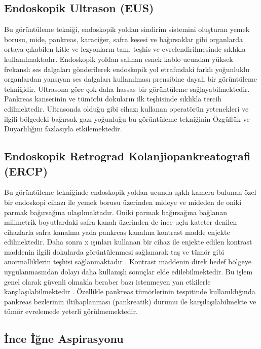 \subsection{Endoskopik Ultrason (EUS)}

Bu görüntüleme tekniği, endoskopik yoldan sindirim sistemini oluşturan yemek borusu, mide, pankreas, karaciğer, safra kesesi ve bağırsaklar gibi organlarda ortaya çıkabilen kitle ve lezyonların tanı, teşhis ve evrelendirilmesinde sıklıkla kullanılmaktadır. Endoskopik yoldan salınan esnek kablo ucundan yüksek frekanslı ses dalgaları gönderilerek endoskopik yol etrafındaki farklı yoğunluklu organlardan yansıyan ses dalgaları kullanılması prensibine dayalı bir görüntüleme tekniğidir. Ultrasona göre çok daha hassas bir görüntüleme sağlayabilmektedir. Pankreas kanserinin ve tümörlü dokuların ilk teşhisinde sıklıkla tercih edilmektedir\cite{rosch1991endoscopic,anderson2000endoscopic}. Ultrasonda olduğu gibi cihazı kullanan operatörün yetenekleri ve ilgili bölgedeki bağırsak gazı yoğunluğu bu görüntüleme tekniğinin Özgüllük ve Duyarlılığını fazlasıyla etkilemektedir.

\subsection{Endoskopik Retrograd Kolanjiopankreatografi (ERCP)}	

Bu görüntüleme tekniğinde endoskopik yoldan ucunda ışıklı kamera bulunan özel bir endoskopi cihazı ile yemek borusu üzerinden mideye ve mideden de oniki parmak bağırsağına ulaşılmaktadır. Oniki parmak bağırsağına bağlanan milimetrik boyutlardaki safra kanalı üzerinden de ince uçlu kateter denilen cihazlarla safra kanalına yada pankreas kanalına kontrast madde enjekte edilmektedir. Daha sonra x ışınları kullanan bir cihaz ile enjekte edilen kontrast maddenin ilgili dokularda görüntülenmesi sağlanarak taş ve tümör gibi anormalliklerin teşhisi sağlanmaktadır \cite{oi1998ercp,hanada2019roles}. Kontrast maddenin direk hedef bölgeye uygulanmasından dolayı daha kullanışlı sonuçlar elde edilebilmektedir. Bu işlem genel olarak güvenli olmakla beraber bazı istenmeyen yan etkilerle karşılaşılabilmektedir \cite{mallery2003complications}. Özellikle pankreas tümörlerinin tespitinde kullanıldığında pankreas bezlerinin iltihaplanması (pankreatik) durumu ile karşılaşılabilmekte ve tümör evrelemede yeterli görülmemektedir.

\subsection{İnce İğne Aspirasyonu}

